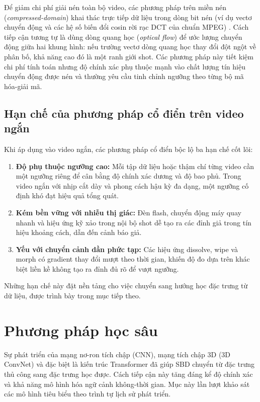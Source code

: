 Để giảm chi phí giải nén toàn bộ video, các phương pháp trên miền nén (\textit{compressed-domain}) khai thác trực tiếp dữ liệu trong dòng bit nén (ví dụ vectơ chuyển động và các hệ số biến đổi cosin rời rạc DCT của chuẩn MPEG) \cite{Kar2024_VideoSBD_IssuesChallengesSolutions}. Cách tiếp cận tương tự là dùng dòng quang học (\textit{optical flow}) để ước lượng chuyển động giữa hai khung hình: nếu trường vectơ dòng quang học thay đổi đột ngột về phân bố, khả năng cao đó là một ranh giới shot. Các phương pháp này tiết kiệm chi phí tính toán nhưng độ chính xác phụ thuộc mạnh vào chất lượng tín hiệu chuyển động được nén và thường yêu cầu tinh chỉnh ngưỡng theo từng bộ mã hóa-giải mã.

\subsection{Hạn chế của phương pháp cổ điển trên video ngắn}
Khi áp dụng vào video ngắn, các phương pháp cổ điển bộc lộ ba hạn chế cốt lõi:
\begin{enumerate}
    \item \textbf{Độ phụ thuộc ngưỡng cao:} Mỗi tập dữ liệu hoặc thậm chí từng video cần một ngưỡng riêng để cân bằng độ chính xác dương và độ bao phủ. Trong video ngắn với nhịp cắt dày và phong cách hậu kỳ đa dạng, một ngưỡng cố định khó đạt hiệu quả tổng quát.
    \item \textbf{Kém bền vững với nhiễu thị giác:} Đèn flash, chuyển động máy quay nhanh và hiệu ứng kỹ xảo trong nội bộ shot dễ tạo ra các đỉnh giả trong tín hiệu khoảng cách, dẫn đến cảnh báo giả.
    \item \textbf{Yếu với chuyển cảnh dần phức tạp:} Các hiệu ứng dissolve, wipe và morph có gradient thay đổi mượt theo thời gian, khiến độ đo dựa trên khác biệt liền kề không tạo ra đỉnh đủ rõ để vượt ngưỡng.
\end{enumerate}
Những hạn chế này đặt nền tảng cho việc chuyển sang hướng học đặc trưng từ dữ liệu, được trình bày trong mục tiếp theo.

\section{Phương pháp học sâu}
\label{sec:deep_learning_methods}
Sự phát triển của mạng nơ-ron tích chập (CNN), mạng tích chập 3D (3D ConvNet) và đặc biệt là kiến trúc Transformer đã giúp SBD chuyển từ đặc trưng thủ công sang đặc trưng học được. Cách tiếp cận này tăng đáng kể độ chính xác và khả năng mô hình hóa ngữ cảnh không-thời gian. Mục này lần lượt khảo sát các mô hình tiêu biểu theo trình tự lịch sử phát triển.

